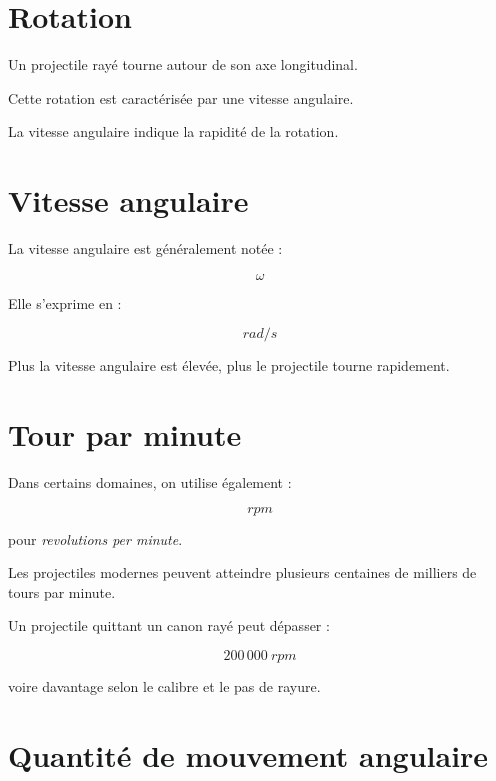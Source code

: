 \section{Rotation}

Un projectile rayé tourne autour de son axe longitudinal.

Cette rotation est caractérisée par une vitesse angulaire.

La vitesse angulaire indique la rapidité de la rotation.

\section{Vitesse angulaire}

La vitesse angulaire est généralement notée :

\begin{equation}
\omega
\end{equation}

Elle s'exprime en :

\begin{equation}
rad/s
\end{equation}

Plus la vitesse angulaire est élevée, plus le projectile tourne rapidement.

\section{Tour par minute}

Dans certains domaines, on utilise également :

\begin{equation}
rpm
\end{equation}

pour \emph{revolutions per minute}.

Les projectiles modernes peuvent atteindre plusieurs centaines de milliers de
tours par minute.

\begin{exemple}

Un projectile quittant un canon rayé peut dépasser :

\begin{equation}
200\,000~rpm
\end{equation}

voire davantage selon le calibre et le pas de rayure.

\end{exemple}

\section{Quantité de mouvement angulaire}

